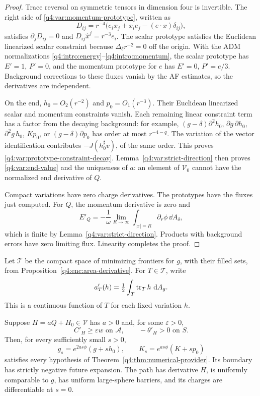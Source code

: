 \begin{proof}
Trace reversal on symmetric tensors in dimension four is invertible. The
right side of \eqref{q4:var:momentum-prototype}, written as
\[
 D_{ij}=r^{-4}\bigl(e_i x_j+x_i e_j-(e\cdot x)\delta_{ij}\bigr),
\]
satisfies $\partial_jD_{ij}=0$ and $D_{ij}\widehat x^j=r^{-3}e_i$.
The scalar prototype satisfies the Euclidean linearized scalar constraint
because $\Delta_\delta r^{-2}=0$ off the origin. With the ADM normalizations
\eqref{q4:intro:energy}--\eqref{q4:intro:momentum}, the scalar prototype
has $E'=1$, $P'=0$, and the momentum
prototype for $e$ has $E'=0$, $P'=e/3$. Background corrections to these
fluxes vanish by the AF estimates, so the derivatives are independent.

On the end, $h_0=O_2(r^{-2})$ and $p_0=O_1(r^{-3})$. Their Euclidean
linearized scalar and momentum constraints vanish. Each remaining linear
constraint term has a factor from the decaying background: for example,
$(g-\delta)\partial^2h_0$, $\partial g\,\partial h_0$,
$\partial^2g\,h_0$, $Kp_0$, or $(g-\delta)\partial p_0$ has order at most
$r^{-4-q}$. The variation of the vector identification contributes
$-J(h_0^\sharp v)$, of the same order. This proves
\eqref{q4:var:prototype-constraint-decay}. Lemma~\ref{q4:var:strict-direction}
then proves \eqref{q4:var:end-value} and the uniqueness of $a$: an element of
$\mathcal V_0$ cannot have the normalized end derivative of $Q$.

Compact variations have zero charge derivatives. The prototypes have the
fluxes just computed. For $Q$, the momentum derivative is zero and
\[
 E'_Q=-\frac1\omega\lim_{R\to\infty}
              \int_{|x|=R}\partial_r\phi\,\dd A_\delta,
\]
which is finite by Lemma~\ref{q4:var:strict-direction}. Products with
background errors have zero limiting flux. Linearity completes the proof.
\end{proof}

Let $\mathcal T$ be the compact space of minimizing frontiers for $g$,
with their filled sets, from Proposition~\ref{q4:enc:area-derivative}.
For $T\in\mathcal T$, write
\begin{equation}
 a'_T(h)=\tfrac12\int_T\operatorname{tr}_T h\,\,\mathrm d A_g.
\label{q4:var:fixed-area-derivative}
\end{equation}
This is a continuous function of $T$ for each fixed variation $h$.

\begin{lemma}
\label{q4:var:feasible-path}
Suppose $H=aQ+H_0\in\mathcal V$ has $a>0$ and, for some $\varepsilon>0$,
\[
 C'_H\ge\varepsilon w\text{ on }\mathcal A,\qquad
 -\theta'_H>0\text{ on }S.
\]
Then, for every sufficiently small $s>0$,
\begin{equation}
 g_s=e^{2as\phi}(g+sh_0),\qquad
 K_s=e^{as\phi}(K+sp_0)
\label{q4:var:nonlinear-path}
\end{equation}
satisfies every hypothesis of Theorem~\ref{q4:thm:numerical-provider}. Its boundary
has strictly negative future expansion. The path has derivative $H$, is
uniformly comparable to $g$, has uniform large-sphere barriers, and its
charges are differentiable at $s=0$.
\end{lemma}

